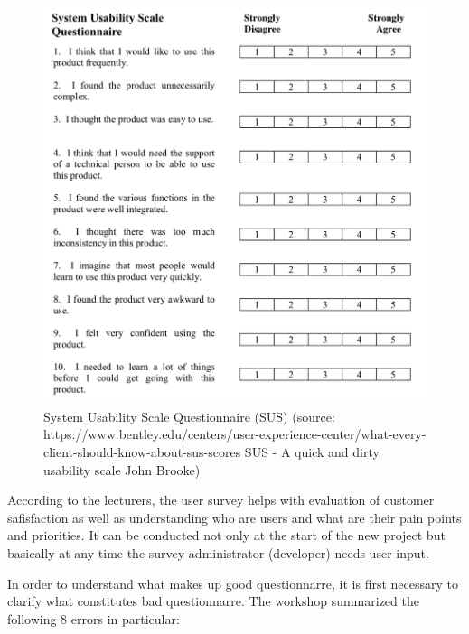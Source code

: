 \documentclass[a4paper,10pt,twoside]{article}
\begin{document}
\vspace{0.3cm}
\begin{figure}[hbt!] 
\begin{center}
\includegraphics[width=14cm]{../pictures/sus.png} 
\caption[System Usability Scale Questionnaire (SUS) ]{System Usability Scale Questionnaire (SUS) (source: https://www.bentley.edu/centers/user-experience-center/what-every-client-should-know-about-sus-scores SUS - A quick and dirty usability scale John Brooke)}
\label{fig:sus}
\end{center}
\end{figure}

\newpage
\noindent According to the lecturers, the user survey helps with evaluation of customer safisfaction as well as understanding who are users and what are their pain points and priorities. It can be conducted not only at the start of the new project but basically at any time the survey administrator (developer) needs user input. 

In order to understand what makes up good questionnarre, it is first necessary to clarify what constitutes bad questionnarre. The workshop summarized the following 8 errors in particular:
\end{document}
